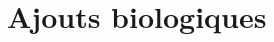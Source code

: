 \documentclass[\main/main.tex]{subfiles}
\begin{document}
\chapter{Ajouts biologiques}






\end{document}
